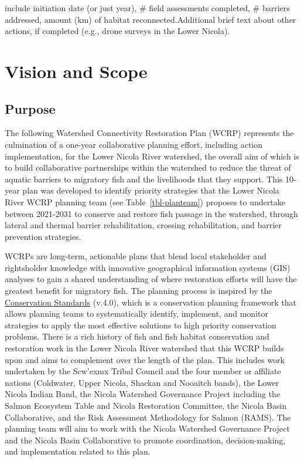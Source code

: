 \documentclass[
  letterpaper,
  DIV=11,
  numbers=noendperiod]{scrreprt}
\begin{document}

include initiation date (or just year), \# field assessments completed,
\# barriers addressed, amount (km) of habitat reconnected.Additional
brief text about other actions, if completed (e.g., drone surveys in the
Lower Nicola).


\hypertarget{vision-and-scope}{%
\chapter{Vision and Scope}\label{vision-and-scope}}

\hypertarget{purpose-1}{%
\section*{Purpose}\label{purpose-1}}


The following Watershed Connectivity Restoration Plan (WCRP) represents
the culmination of a one-year collaborative planning effort, including
action implementation, for the Lower Nicola River watershed, the overall
aim of which is to build collaborative partnerships within the watershed
to reduce the threat of aquatic barriers to migratory fish and the
livelihoods that they support. This 10-year plan was developed to
identify priority strategies that the Lower Nicola River WCRP planning
team (see Table~\ref{tbl-planteam}) proposes to undertake between
2021-2031 to conserve and restore fish passage in the watershed, through
lateral and thermal barrier rehabilitation, crossing rehabilitation, and
barrier prevention strategies.

WCRPs are long-term, actionable plans that blend local stakeholder and
rightsholder knowledge with innovative geographical information systems
(GIS) analyses to gain a shared understanding of where restoration
efforts will have the greatest benefit for migratory fish. The planning
process is inspired by the
\href{https://conservationstandards.org/wp-content/uploads/sites/3/2023/09/CMP-Open-Standards-for-the-Practice-of-Conservation-v4.0-English.pdf}{Conservation
Standards} (v.4.0), which is a conservation planning framework that
allows planning teams to systematically identify, implement, and monitor
strategies to apply the most effective solutions to high priority
conservation problems. There is a rich history of fish and fish habitat
conservation and restoration work in the Lower Nicola River watershed
that this WCRP builds upon and aims to complement over the length of the
plan. This includes work undertaken by the Scw'exmx Tribal Council and
the four member or affiliate nations (Coldwater, Upper Nicola, Shackan
and Nooaitch bands), the Lower Nicola Indian Band, the Nicola Watershed
Governance Project including the Salmon Ecosystem Table and Nicola
Restoration Committee, the Nicola Basin Collaborative, and the Risk
Assessment Methodology for Salmon (RAMS). The planning team will aim to
work with the Nicola Watershed Governance Project and the Nicola Basin
Collaborative to promote coordination, decision-making, and
implementation related to this plan.
\end{document}
